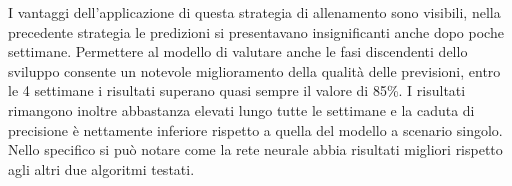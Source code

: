 \documentclass[%
    corpo=12pt,
    twoside,
    oldstyle,
    autoretitolo,
    greek,
    evenboxes,
]{toptesi}
\begin{document}
\begin{center}
   \label{tab:cross_version_hadoop}
\end{center}
I vantaggi dell'applicazione di questa strategia di allenamento sono visibili, nella precedente strategia le predizioni si presentavano insignificanti anche dopo poche settimane. Permettere al modello di valutare anche le fasi discendenti dello sviluppo consente un notevole miglioramento della qualità delle previsioni, entro le 4 settimane i risultati superano quasi sempre il valore di 85\%. I risultati rimangono inoltre abbastanza elevati lungo tutte le settimane e la caduta di precisione è nettamente inferiore rispetto a quella del modello a scenario singolo. Nello specifico si può notare come la rete neurale abbia risultati migliori rispetto agli altri due algoritmi testati.
\end{document}
